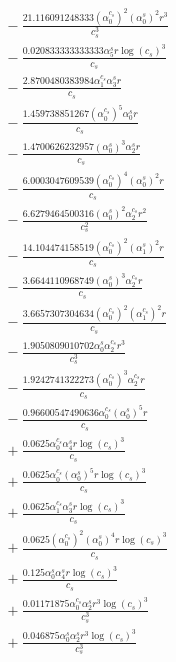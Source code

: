 \documentclass[10pt]{article}
\begin{document}
\begin{align*}
&{}  - \frac{21.116091248333 \left(\alpha_{0}^{c_s}\right)^{2} \left(\alpha_{0}^s\right)^{2} r^{3}}{c_{s}^{3}} \\
&{}  - \frac{0.020833333333333 \alpha_{5}^s r \log{\left(c_{s} \right)}^{3}}{c_{s}} \\
&{}  - \frac{2.8700480383984 \alpha_{1}^{c_s} \alpha_{3}^s r}{c_{s}} \\
&{}  - \frac{1.459738851267 \left(\alpha_{0}^{c_s}\right)^{5} \alpha_{0}^s r}{c_{s}} \\
&{}  - \frac{1.4700626232957 \left(\alpha_{0}^s\right)^{3} \alpha_{2}^s r}{c_{s}} \\
&{}  - \frac{6.0003047609539 \left(\alpha_{0}^{c_s}\right)^{4} \left(\alpha_{0}^s\right)^{2} r}{c_{s}} \\
&{}  - \frac{6.6279464500316 \left(\alpha_{0}^s\right)^{2} \alpha_{2}^{c_s} r^{2}}{c_{s}^{2}} \\
&{}  - \frac{14.104474158519 \left(\alpha_{0}^{c_s}\right)^{2} \left(\alpha_{1}^s\right)^{2} r}{c_{s}} \\
&{}  - \frac{3.6644110968749 \left(\alpha_{0}^s\right)^{3} \alpha_{2}^{c_s} r}{c_{s}} \\
&{}  - \frac{3.6657307304634 \left(\alpha_{0}^{c_s}\right)^{2} \left(\alpha_{1}^{c_s}\right)^{2} r}{c_{s}} \\
&{}  - \frac{1.9050809010702 \alpha_{0}^s \alpha_{2}^{c_s} r^{3}}{c_{s}^{3}} \\
&{}  - \frac{1.9242741322273 \left(\alpha_{0}^{c_s}\right)^{3} \alpha_{2}^{c_s} r}{c_{s}} \\
&{}  - \frac{0.96600547490636 \alpha_{0}^{c_s} \left(\alpha_{0}^s\right)^{5} r}{c_{s}} \\
&{}  + \frac{0.0625 \alpha_{0}^{c_s} \alpha_{4}^s r \log{\left(c_{s} \right)}^{3}}{c_{s}} \\
&{}  + \frac{0.0625 \alpha_{0}^{c_s} \left(\alpha_{0}^s\right)^{5} r \log{\left(c_{s} \right)}^{3}}{c_{s}} \\
&{}  + \frac{0.0625 \alpha_{1}^{c_s} \alpha_{3}^s r \log{\left(c_{s} \right)}^{3}}{c_{s}} \\
&{}  + \frac{0.0625 \left(\alpha_{0}^{c_s}\right)^{2} \left(\alpha_{0}^s\right)^{4} r \log{\left(c_{s} \right)}^{3}}{c_{s}} \\
&{}  + \frac{0.125 \alpha_{0}^s \alpha_{4}^s r \log{\left(c_{s} \right)}^{3}}{c_{s}} \\
&{}  + \frac{0.01171875 \alpha_{0}^{c_s} \alpha_{2}^s r^{3} \log{\left(c_{s} \right)}^{3}}{c_{s}^{3}} \\
&{}  + \frac{0.046875 \alpha_{0}^s \alpha_{2}^s r^{3} \log{\left(c_{s} \right)}^{3}}{c_{s}^{3}} \\

\end{align*}
\end{document}
